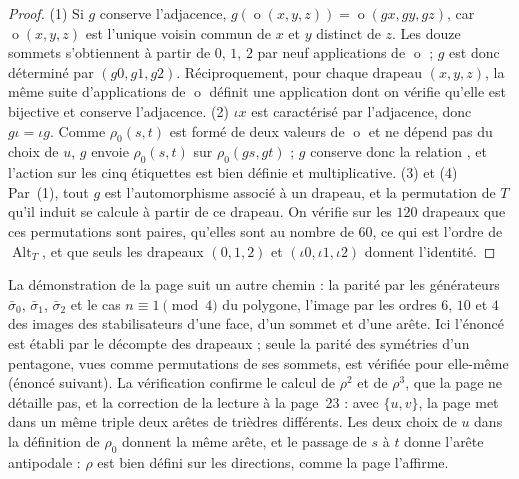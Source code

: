 \begin{proof}
(1) Si $g$ conserve l'adjacence, $g(\operatorname{o}(x, y, z)) = \operatorname{o}(gx, gy, gz)$, car $\operatorname{o}(x, y, z)$ est l'unique voisin commun de $x$ et $y$ distinct de $z$. Les douze sommets s'obtiennent à partir de $0$, $1$, $2$ par neuf applications de $\operatorname{o}$ ; $g$ est donc déterminé par $(g0, g1, g2)$. Réciproquement, pour chaque drapeau $(x, y, z)$, la même suite d'applications de $\operatorname{o}$ définit une application dont on vérifie qu'elle est bijective et conserve l'adjacence. (2) $\iota x$ est caractérisé par l'adjacence, donc $g\iota = \iota g$. Comme $\rho_0(s, t)$ est formé de deux valeurs de $\operatorname{o}$ et ne dépend pas du choix de $u$, $g$ envoie $\rho_0(s, t)$ sur $\rho_0(gs, gt)$ ; $g$ conserve donc la relation , et l'action sur les cinq étiquettes est bien définie et multiplicative. (3) et (4) Par~(1), tout $g$ est l'automorphisme associé à un drapeau, et la permutation de $T$ qu'il induit se calcule à partir de ce drapeau. On vérifie sur les $120$ drapeaux que ces permutations sont paires, qu'elles sont au nombre de $60$, ce qui est l'ordre de $\operatorname{Alt}_T$, et que seuls les drapeaux $(0, 1, 2)$ et $(\iota 0, \iota 1, \iota 2)$ donnent l'identité.
\end{proof}

\begin{remarque}
La démonstration de la page suit un autre chemin : la parité par les générateurs $\bar\sigma_0$, $\bar\sigma_1$, $\bar\sigma_2$ et le cas $n \equiv 1 \pmod 4$ du polygone, l'image par les ordres $6$, $10$ et $4$ des images des stabilisateurs d'une face, d'un sommet et d'une arête. Ici l'énoncé est établi par le décompte des drapeaux ; seule la parité des symétries d'un pentagone, vues comme permutations de ses sommets, est vérifiée pour elle-même (énoncé suivant). La vérification confirme le calcul de $\rho^2$ et de $\rho^3$, que la page ne détaille pas, et la correction de la lecture à la page~23 : avec $\{u, v\}$, la page met dans un même triple deux arêtes de trièdres différents. Les deux choix de $u$ dans la définition de $\rho_0$ donnent la même arête, et le passage de $s$ à $t$ donne l'arête antipodale : $\rho$ est bien défini sur les directions, comme la page l'affirme.
\end{remarque}


